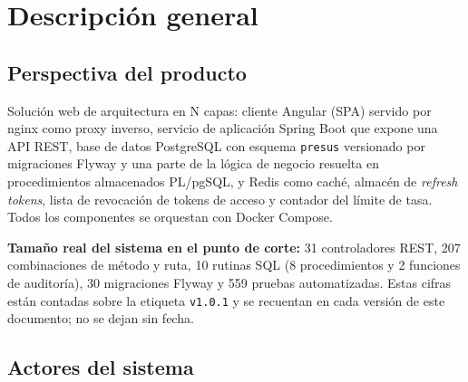 \documentclass[11pt,a4paper]{article}
\begin{document}
\section{Descripción general}

\subsection{Perspectiva del producto}
Solución web de arquitectura en N capas: cliente Angular (SPA) servido por nginx como proxy
inverso, servicio de aplicación Spring Boot que expone una API REST, base de datos PostgreSQL
con esquema \texttt{presus} versionado por migraciones Flyway y una parte de la lógica de
negocio resuelta en procedimientos almacenados PL/pgSQL, y Redis como caché, almacén de
\emph{refresh tokens}, lista de revocación de tokens de acceso y contador del límite de tasa.
Todos los componentes se orquestan con Docker Compose.

\textbf{Tamaño real del sistema en el punto de corte:} 31 controladores REST, 207 combinaciones
de método y ruta, 10 rutinas SQL (8 procedimientos y 2 funciones de auditoría), 30 migraciones
Flyway y 559 pruebas automatizadas. Estas cifras están contadas sobre la etiqueta
\texttt{v1.0.1} y se recuentan en cada versión de este documento; no se dejan sin fecha.

\subsection{Actores del sistema}
\label{sec:actores}
\end{document}
